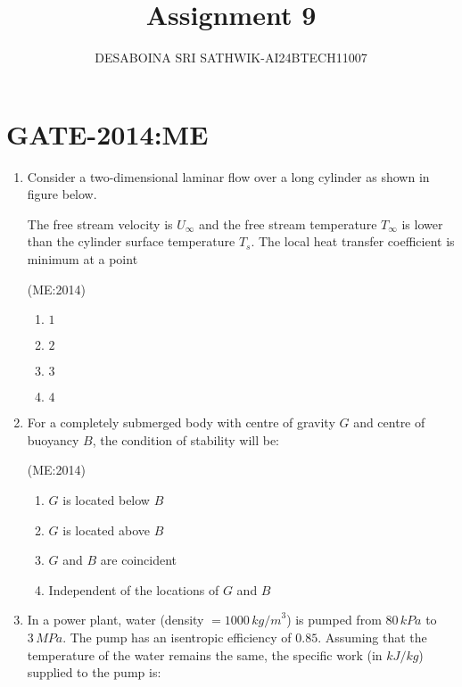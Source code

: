\documentclass[journal,12pt,onecolumn]{IEEEtran}
\theoremstyle{remark}
\begin{document}

\vspace{3cm}

\title{Assignment 9}
\author{DESABOINA SRI SATHWIK-AI24BTECH11007}
\maketitle
\bigskip

\section*{GATE-2014:ME}
\begin{enumerate}
	\item
		Consider a two-dimensional laminar flow over a long cylinder as shown in figure below.\\
		\vspace{0.5cm}
            \begin{center}
		    
	    \end{center}
		\vspace{0.5cm}
		The free stream velocity is $U_{\infty}$ and the free stream temperature $T_{\infty}$ is lower than the cylinder surface temperature $T_s$. The local heat transfer coefficient is minimum at a point 

		\hfill{(ME:2014)}
    \begin{multicols}{4}
    \begin{enumerate}
        \item $1$
        \item $2$
        \item $3$
        \item $4$
    \end{enumerate}
    \end{multicols}

\vspace{0.5cm}

    \item For a completely submerged body with centre of gravity $G$ and centre of buoyancy $B$, the condition of stability will be: 

	   	    
	    \hfill{(ME:2014)}
    \begin{multicols}{2}
    \begin{enumerate}
        \item $G$ is located below $B$
        \item $G$ is located above $B$
        \item $G$ and $B$ are coincident
        \item Independent of the locations of $G$ and $B$
    \end{enumerate}
    \end{multicols}
\vspace{0.5cm}
    \item In a power plant, water (density $= 1000 \, {kg/m}^3$) is pumped from $80 \, kPa$ to $3 \, MPa$. The pump has an isentropic efficiency of $0.85$. Assuming that the temperature of the water remains the same, the specific work (in $kJ/kg$) supplied to the pump is: 
	    

\end{enumerate}
\end{document}

